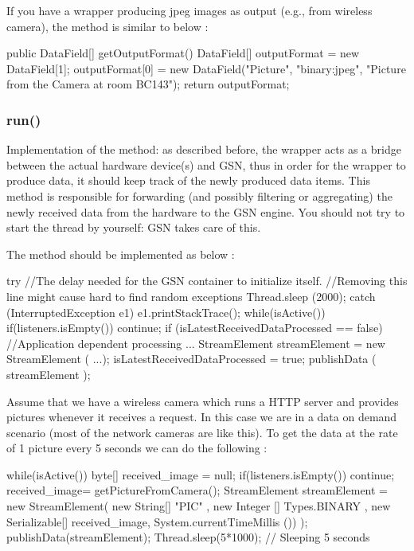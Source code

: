 If you have a wrapper producing jpeg images as output (e.g., from wireless
camera), the method is similar to below :

\begin{javacode}
	public DataField[] getOutputFormat() {
		DataField[] outputFormat = new DataField[1];
		outputFormat[0] = new DataField("Picture", "binary:jpeg",
			"Picture from the Camera at room BC143");
		return outputFormat;
	}
\end{javacode}

\subsubsection{run()}
Implementation of the  method: as described before, the wrapper acts as
a bridge between the actual hardware device(s) and GSN, thus in order for the
wrapper to produce data, it should keep track of the newly produced data items.
This method is responsible for forwarding (and possibly filtering or aggregating)
the newly received data from the hardware to the GSN engine.
You should not try to start the thread by yourself: GSN takes care of this.

The method should be implemented as below :
\begin{javacode}
	try {
		//The delay needed for the GSN container to initialize itself.
		//Removing this line might cause hard to find random exceptions
		Thread.sleep (2000);
		} catch (InterruptedException e1) {
			e1.printStackTrace();
		}
		while(isActive()) {
			if(listeners.isEmpty())
				continue;
			if (isLatestReceivedDataProcessed == false) {
				//Application dependent processing ...
				StreamElement streamElement = new StreamElement ( ...);
				isLatestReceivedDataProcessed = true;
				publishData ( streamElement );
		}
	}
\end{javacode}

Assume that we have a wireless camera which runs a HTTP server and provides
pictures whenever it receives a  request. In this case we are in a data on
demand scenario (most of the network cameras are like this). To get the data
at the rate of 1 picture every 5 seconds we can do the following :

\begin{javacode}
	while(isActive()) {
		byte[] received_image = null;
		if(listeners.isEmpty())
			continue;
		received_image= getPictureFromCamera();
		StreamElement streamElement = new StreamElement(
			new String[] { "PIC" },
			new Integer [] { Types.BINARY },
			new Serializable[] {received_image},
			System.currentTimeMillis ())
		);
		publishData(streamElement);
		Thread.sleep(5*1000); // Sleeping 5 seconds
	}
\end{javacode}

